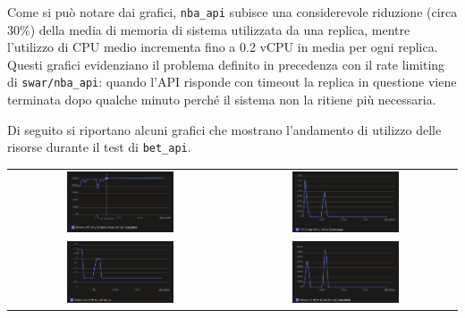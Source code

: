 Come si può notare dai grafici, \texttt{nba\_api} subisce una considerevole riduzione (circa 30\%) della media di memoria di sistema utilizzata da una replica, mentre l'utilizzo di CPU medio incrementa fino a 0.2 vCPU in media per ogni replica. Questi grafici evidenziano il problema definito in precedenza con il rate limiting di \texttt{swar/nba\_api}: quando l'API risponde con timeout la replica in questione viene terminata dopo qualche minuto perché il sistema non la ritiene più necessaria.

Di seguito si riportano alcuni grafici che mostrano l'andamento di utilizzo delle risorse durante il test di \texttt{bet\_api}.

\begin{tabular}{ c c }
    \includegraphics[width=0.5\textwidth]{img/load_test/bet-api-mem-avg.png} & \includegraphics[width=0.5\textwidth]{img/load_test/bet-api-cpu-avg.png} \\
    \includegraphics[width=0.5\textwidth]{img/load_test/bet-api-rep-count.png} & \includegraphics[width=0.5\textwidth]{img/load_test/bet-api-rx-sum.png} \\
\end{tabular}

